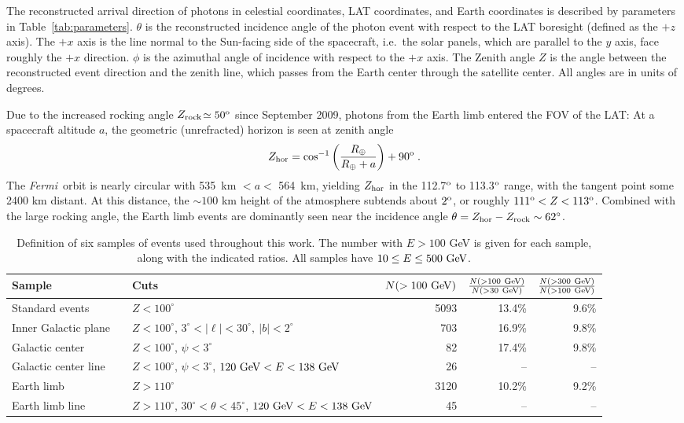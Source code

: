 \documentclass[aps,twocolumn,prd,superscriptaddress,showpacs,nofootinbib,fixfloat]{revtex4}
\newcommand{\be}{\begin{equation}}
\newcommand{\ee}{\end{equation}}
\newcommand{\Fermi}{{\slshape Fermi}}
\newcommand{\GeV}{{\rm ~GeV}}
\newcommand{\degree}{^{\rm o}}
\newcommand{\zrock}{$Z_{\rm rock}$}
\begin{document}
The reconstructed arrival direction of photons in celestial
coordinates, LAT coordinates, and Earth coordinates is
described by parameters in Table~\ref{tab:parameters}.
$\theta$ is the reconstructed incidence angle of the photon
event with respect to the LAT boresight (defined as the $+z$
axis).  The $+x$ axis is the line normal to the Sun-facing
side of the spacecraft, i.e.~the solar panels, which are
parallel to the $y$ axis, face roughly the $+x$ direction.
$\phi$ is the azimuthal angle of incidence with respect to
the $+x$ axis. The Zenith angle $Z$ is the angle between the
reconstructed event direction and the zenith line, which
passes from the Earth center through the satellite center.
All angles are in units of degrees.

Due to the increased rocking angle \zrock$\simeq50\degree$
since September 2009, photons from the Earth limb
entered the FOV of the LAT:
%
At a spacecraft altitude $a$, the geometric (unrefracted) horizon is seen at zenith angle \be
Z_{\rm hor} = \cos^{-1}\left(\frac{R_\oplus}{R_\oplus+a}\right)+90\degree\;. \ee
The \Fermi\ orbit is nearly circular with 535~km $< a <$ 564~km, yielding
$Z_{\rm hor}$ in the 112.7$\degree$ to 113.3$\degree$ range, with the tangent
point some 2400 km distant.  At this distance, the $\sim 100$ km height of the
atmosphere subtends about $2\degree$, or roughly $111\degree < Z <
113\degree$. Combined with the large rocking angle, the Earth limb events are
dominantly seen near the incidence angle $\theta=Z_{\rm hor}-Z_{\rm rock}\sim 62^\circ$.
\medskip

\begin{table}
  \begin{tabular}{lllrrr}
    \hline
    Sample &&Cuts & $N(>100\GeV)$ & $\frac{N(>100\GeV)}{N(>30\GeV)}$ & $\frac{N(>300\GeV)}{N(>100\GeV)}$\\
    \hline
    Standard events      &  & $Z<100^\circ$ & 5093 & 13.4\% & 9.6\% \\
    Inner Galactic plane &  & $Z<100^\circ$, $3^\circ < |\ell| < 30^\circ,\ |b|<2^\circ$     & 703 & 16.9\% & 9.8\% \\
    Galactic center      &  & $Z<100^\circ$, $\psi<3^\circ$ & 82 & 17.4\% & 9.8\% \\
    Galactic center line &  & $Z<100^\circ$, $\psi<3^\circ$, $120\GeV<E<138\GeV$             & 26 & -- & -- \\
    Earth limb           &  & $Z>110^\circ$ & 3120 & 10.2\% & 9.2\% \\
    Earth limb line      &  & $Z>110^\circ$, $30^\circ<\theta<45^\circ$, $120\GeV<E<138\GeV$ & 45 & -- & -- \\ 
    \hline
  \end{tabular}
  \caption{Definition of six samples of events used throughout this work.  The
    number with $E>100$ GeV is given for each sample, along with the indicated
    ratios.  All samples have $10\leq E\leq500\GeV$.}
  \label{tab:regions}
\end{table}
\end{document}
